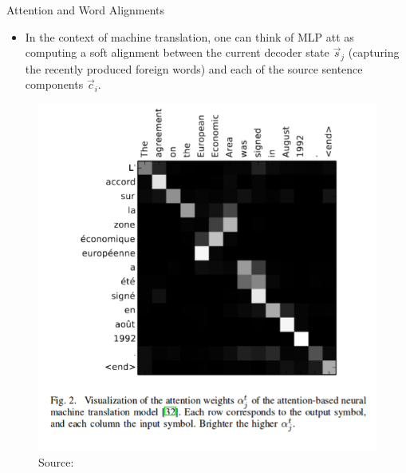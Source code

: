\begin{frame}{Attention and Word Alignments}
\begin{scriptsize}
\begin{itemize}
\item In the context of machine translation, one can think of MLP att as computing a soft alignment between the current decoder state $\vec{s}_j$ (capturing the recently produced foreign words) and each of the source sentence components $\vec{c}_i$.


\end{itemize}


         \begin{figure}[h]
        	\includegraphics[scale = 0.28]{pics/attention-alignment.png}
        	\caption{Source: \cite{cho2015describing}}
        \end{figure}  


\end{scriptsize}
\end{frame}



